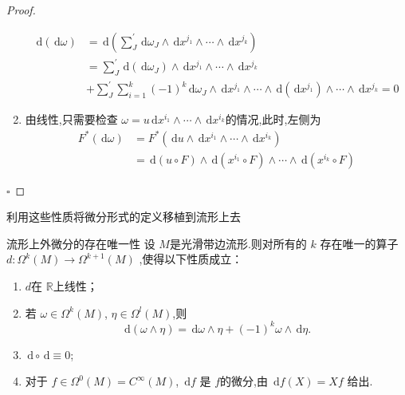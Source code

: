 \documentclass[../../几何与拓扑.tex]{subfiles}
\begin{document}
\begin{proof}
\begin{enumerate}
$$\begin{aligned}
    \,\mathrm{d} \left( \,\mathrm{d}  \omega  \right)  & = \,\mathrm{d} \left( \sum _{J}^{\prime} \,\mathrm{d}  \omega _{J}\wedge \,\mathrm{d} x^{j_1}\wedge \cdots \wedge \,\mathrm{d} x^{j_{k}} \right) \\ 
     & = \sum _{J}^{\prime}  \,\mathrm{d} \left( \,\mathrm{d}  \omega _{J} \right)\wedge \,\mathrm{d} x^{j_1} \wedge \cdots \wedge \,\mathrm{d} x^{j_{k}}\\ 
      & +  \sum _{J}^{\prime} \sum _{i=1}^{k}\left( -1 \right)^{k} \,\mathrm{d}  \omega _{J}\wedge \,\mathrm{d} x^{j_1}\wedge \cdots \wedge \,\mathrm{d} \left( \,\mathrm{d} x^{j_1} \right)\wedge \cdots \wedge \,\mathrm{d} x^{j_{k}}  =0
    \end{aligned}
    $$            
    \item 由线性,只需要检查 $  \omega  = u\,\mathrm{d} x^{i_1}\wedge \cdots \wedge \,\mathrm{d} x^{i_{k}} $的情况,此时,左侧为 $$
    \begin{aligned}
    F^{*}\left( \,\mathrm{d}  \omega  \right)& =  F^{*} \left( \,\mathrm{d} u \wedge \,\mathrm{d} x^{i_1}\wedge \cdots \wedge \,\mathrm{d} x^{i_{k}} \right)\\ 
     & =  \,\mathrm{d} \left( u\circ F \right)\wedge \,\mathrm{d} \left( x^{i_1}\circ F \right)\wedge \cdots \wedge \,\mathrm{d} \left( x^{i_{k}} \circ F\right)   
    \end{aligned}
    $$ 
\end{enumerate}
\hfill $\square$
\end{proof}


利用这些性质将微分形式的定义移植到流形上去

\begin{theorem}{流形上外微分的存在唯一性}
    设 $ M $是光滑带边流形.则对所有的 $ k $ 存在唯一的算子 $ d:  \Omega ^{k}\left( M \right)\to   \Omega ^{k+ 1}\left( M \right)   $  ,使得以下性质成立：
    \begin{enumerate}
        \item  $ d $在 $ \mathbb{R}  $上线性；
        \item 若 $  \omega  \in  \Omega ^{k}\left( M \right)  $, $ \eta  \in  \Omega ^{l}\left( M \right)  $,则 $$
        \,\mathrm{d} \left(  \omega \wedge \eta  \right)  =  \,\mathrm{d}  \omega \wedge \eta + \left( -1 \right)^{k}  \omega \wedge \,\mathrm{d} \eta .  
        $$    
        \item $ \,\mathrm{d} \circ \,\mathrm{d}  \equiv 0 $;
        \item 对于 $ f \in  \Omega ^{0}\left( M \right) = C^{\infty}\left( M \right)   $, $ \,\mathrm{d} f $ 是 $ f $的微分,由 $ \,\mathrm{d} f\left( X \right) = Xf  $  给出.
    \end{enumerate}
    
\end{theorem}
\end{document}
